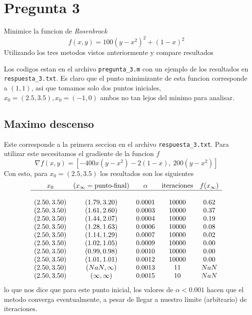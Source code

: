 \documentclass[letterpaper]{article}
\begin{document}
\section*{Pregunta 3}
\noindent Minimice la funcion de \emph{Rosenbrock}
\[ f(x,y) = 100 (y - x^2)^2 + (1 - x)^2 \]
Utilizando los tres metodos vistos anteriormente y compare resultados
\newline

Los codigos estan en el archivo \texttt{pregunta\_3.m} con un ejemplo de
los resultados en \texttt{respuesta\_3.txt}. Es claro que el punto
minimizante de esta funcion corresponde a \((1,1)\), asi que tomamos solo
dos puntos iniciales, \(x_0 = (2.5, 3.5), x_0 = (-1,0) \) ambos no tan
lejos del minimo para analisar.

\subsection*{Maximo descenso}
Este corresponde a la primera seccion en el archivo
\texttt{respuesta\_3.txt}. Para utilizar este necesitamos el gradiente de
la funcion \(f\)
\[ \nabla f (x,y) = [-400 x (y - x^2) - 2 (1-x),\ 200 (y-x^2)] \]
Con esto, para \(x_0 = (2.5, 3.5)\) los resultados son los siguientes
\[
\begin{array}{c c c c c}
  x_0 & (x_{\infty} = \text{punto-final}) & \alpha & \text{iteraciones} &
    f(x_{\infty}) \\
  \hline \\
  (2.50, 3.50) & (1.79, 3.20)     & 0.0001 & 10000 & 0.62 \\
  (2.50, 3.50) & (1.61, 2.60)     & 0.0003 & 10000 & 0.37 \\
  (2.50, 3.50) & (1.44, 2.07)     & 0.0004 & 10000 & 0.19 \\
  (2.50, 3.50) & (1.28, 1.63)     & 0.0006 & 10000 & 0.08 \\
  (2.50, 3.50) & (1.14, 1.29)     & 0.0007 & 10000 & 0.02 \\
  (2.50, 3.50) & (1.02, 1.05)     & 0.0009 & 10000 & 0.00 \\
  (2.50, 3.50) & (0.99, 0.98)     & 0.0010 & 10000 & 0.00 \\
  (2.50, 3.50) & (1.01, 1.01)     & 0.0012 & 10000 & 0.00 \\
  (2.50, 3.50) & (NaN, \infty)    & 0.0013 & 11    & NaN  \\
  (2.50, 3.50) & (\infty, \infty) & 0.0015 & 10    & NaN  \\
\end{array}
\]
lo que nos dice que para este punto inicial, los valores de \(\alpha <
0.001\) hacen que el metodo converga eventualmente, a pesar de llegar a
nuestro limite (arbitrario) de iteraciones.
\end{document}
